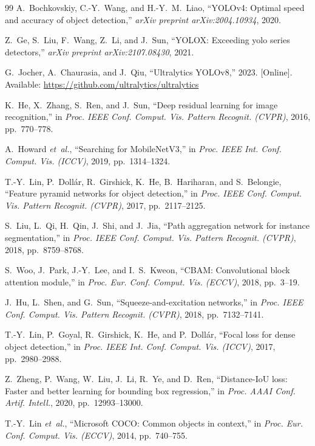 \documentclass[conference]{IEEEtran}
\begin{document}
\begin{thebibliography}{99}
A.~Bochkovskiy, C.-Y.~Wang, and H.-Y.~M.~Liao, ``YOLOv4:
Optimal speed and accuracy of object detection,''
\textit{arXiv preprint arXiv:2004.10934}, 2020.

Z.~Ge, S.~Liu, F.~Wang, Z.~Li, and J.~Sun, ``YOLOX: Exceeding
yolo series detectors,'' \textit{arXiv preprint
arXiv:2107.08430}, 2021.

G.~Jocher, A.~Chaurasia, and J.~Qiu, ``Ultralytics YOLOv8,''
2023. [Online]. Available: \url{https://github.com/ultralytics/ultralytics}

K.~He, X.~Zhang, S.~Ren, and J.~Sun, ``Deep residual learning
for image recognition,'' in \textit{Proc. IEEE Conf. Comput.
Vis. Pattern Recognit. (CVPR)}, 2016, pp.~770--778.

A.~Howard \textit{et~al.}, ``Searching for MobileNetV3,'' in
\textit{Proc. IEEE Int. Conf. Comput. Vis. (ICCV)}, 2019,
pp.~1314--1324.

T.-Y.~Lin, P.~Doll{\'a}r, R.~Girshick, K.~He, B.~Hariharan, and
S.~Belongie, ``Feature pyramid networks for object detection,''
in \textit{Proc. IEEE Conf. Comput. Vis. Pattern Recognit.
(CVPR)}, 2017, pp.~2117--2125.

S.~Liu, L.~Qi, H.~Qin, J.~Shi, and J.~Jia, ``Path aggregation
network for instance segmentation,'' in \textit{Proc. IEEE Conf.
Comput. Vis. Pattern Recognit. (CVPR)}, 2018, pp.~8759--8768.

S.~Woo, J.~Park, J.-Y.~Lee, and I.~S.~Kweon, ``CBAM:
Convolutional block attention module,'' in \textit{Proc. Eur.
Conf. Comput. Vis. (ECCV)}, 2018, pp.~3--19.

J.~Hu, L.~Shen, and G.~Sun, ``Squeeze-and-excitation networks,''
in \textit{Proc. IEEE Conf. Comput. Vis. Pattern Recognit.
(CVPR)}, 2018, pp.~7132--7141.

T.-Y.~Lin, P.~Goyal, R.~Girshick, K.~He, and P.~Doll{\'a}r,
``Focal loss for dense object detection,'' in \textit{Proc.
IEEE Int. Conf. Comput. Vis. (ICCV)}, 2017, pp.~2980--2988.

Z.~Zheng, P.~Wang, W.~Liu, J.~Li, R.~Ye, and D.~Ren,
``Distance-IoU loss: Faster and better learning for bounding
box regression,'' in \textit{Proc. AAAI Conf. Artif. Intell.},
2020, pp.~12993--13000.

T.-Y.~Lin \textit{et~al.}, ``Microsoft COCO: Common objects in
context,'' in \textit{Proc. Eur. Conf. Comput. Vis. (ECCV)},
2014, pp.~740--755.


\end{thebibliography}
\end{document}
